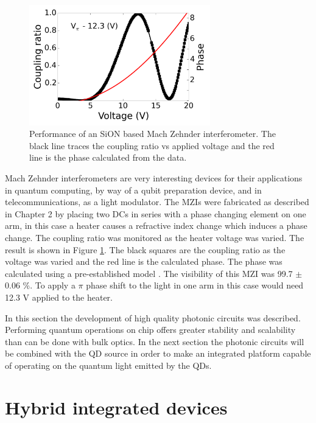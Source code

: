 \begin{figure}[h!] \begin{center}
\includegraphics[width=0.7\textwidth]{images/W010_C06_phase_voltage_MZ1_5_5_6.png}
\caption{Performance of an SiON based Mach Zehnder interferometer. The black
line traces the coupling ratio vs applied voltage and the red line is the phase
calculated from the data.} \label{fig:mz} \end{center} \end{figure}

Mach Zehnder interferometers are very interesting devices for their applications
in quantum computing, by way of a qubit preparation device, and in
telecommunications, as a light modulator. The MZIs were fabricated as described
in Chapter 2 by placing two DCs in series with a phase changing element on one
arm, in this case a heater causes a refractive index change which induces a
phase change. The coupling ratio was monitored as the heater voltage was varied.
The result is shown in Figure \ref{fig:mz}. The black squares are the coupling
ratio as the voltage was varied and the red line is the calculated phase. The
phase was calculated using a pre-established model
\cite{matthews2009manipulation}. The visibility of this MZI was 99.7 $\pm$ 0.06 \%.
To apply a $\pi$ phase shift to the light in one arm in this case would need
12.3 V applied to the heater.

In this section the development of high quality photonic circuits was described.
Performing quantum operations on chip offers greater stability and scalability
than can be done with bulk optics. In the next section the photonic circuits
will be combined with the QD source in order to make an integrated platform
capable of operating on the quantum light emitted by the QDs.

\section{Hybrid integrated devices}

